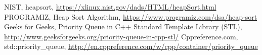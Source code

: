 \begin{thebibliography}{9}
NIST, heapsort, \href{https://xlinux.nist.gov/dads/HTML/heapSort.html}{https://xlinux.nist.gov/dads/HTML/heapSort.html}
PROGRAMIZ, Heap Sort Algorithm, \href{https://www.programiz.com/dsa/heap-sort}{https://www.programiz.com/dsa/heap-sort}
Geeks for Geeks, Priority Queue in C++ Standard Template Library (STL), \href{http://www.geeksforgeeks.org/priority-queue-in-cpp-stl/}{http://www.geeksforgeeks.org/priority-queue-in-cpp-stl/}
Cppreference.com, std::priority\_queue, \href{http://en.cppreference.com/w/cpp/container/priority_queue}{http://en.cppreference.com/w/cpp/container/priority\_queue}
\end{thebibliography}

